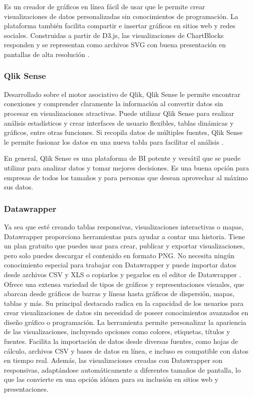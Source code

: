 \documentclass[
  11pt,
  bookmarksnumbered]{article}
\begin{document}
Es un creador de gráficos en línea fácil de usar que le permite crear visualizaciones de datos personalizadas sin conocimientos de programación.
La plataforma también facilita compartir e insertar gráficos en sitios web y redes sociales.
Construidas a partir de D3.js, las visualizaciones de ChartBlocks responden y se representan como archivos SVG con buena presentación en pantallas de alta resolución \textcite{upwork2023best}.

\hypertarget{qlik-sense}{%
\subsubsection{Qlik Sense}\label{qlik-sense}}

Desarrollado sobre el motor asociativo de Qlik, Qlik Sense le permite encontrar conexiones y comprender claramente la información al convertir datos sin procesar en visualizaciones atractivas.
Puede utilizar Qlik Sense para realizar análisis estadísticos y crear interfaces de usuario flexibles, tablas dinámicas y gráficos, entre otras funciones.
Si recopila datos de múltiples fuentes, Qlik Sense le permite fusionar los datos en una nueva tabla para facilitar el análisis \textcite{upwork2023best}.

En general, Qlik Sense es una plataforma de BI potente y versátil que se puede utilizar para analizar datos y tomar mejores decisiones.
Es una buena opción para empresas de todos los tamaños y para personas que desean aprovechar al máximo sus datos.

\hypertarget{datawrapper}{%
\subsubsection{Datawrapper}\label{datawrapper}}

Ya sea que esté creando tablas responsivas, visualizaciones interactivas o mapas, Datawrapper proporciona herramientas para ayudar a contar una historia.
Tiene un plan gratuito que puedes usar para crear, publicar y exportar visualizaciones, pero solo puedes descargar el contenido en formato PNG.
No necesita ningún conocimiento especial para trabajar con Datawrapper y puede importar datos desde archivos CSV y XLS o copiarlos y pegarlos en el editor de Datawrapper \textcite{upwork2023best}.
Ofrece una extensa variedad de tipos de gráficos y representaciones visuales, que abarcan desde gráficos de barras y líneas hasta gráficos de dispersión, mapas, tablas y más.
Su principal destacado radica en la capacidad de los usuarios para crear visualizaciones de datos sin necesidad de poseer conocimientos avanzados en diseño gráfico o programación.
La herramienta permite personalizar la apariencia de las visualizaciones, incluyendo opciones como colores, etiquetas, títulos y fuentes.
Facilita la importación de datos desde diversas fuentes, como hojas de cálculo, archivos CSV y bases de datos en línea, e incluso es compatible con datos en tiempo real.
Además, las visualizaciones creadas con Datawrapper son responsivas, adaptándose automáticamente a diferentes tamaños de pantalla, lo que las convierte en una opción idónea para su inclusión en sitios web y presentaciones.
\end{document}
